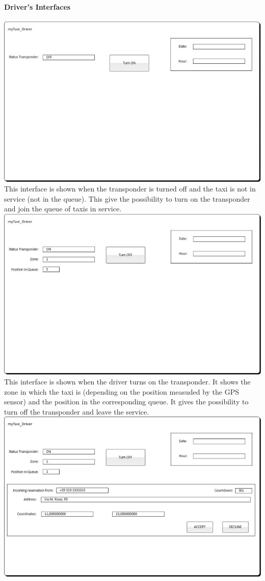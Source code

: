 \documentclass[12pt,a4paper]{book}
\begin{document}
				\paragraph{Driver's Interfaces}
				\hfill\break
				\includegraphics {driver_page1}
				\hfill\break
				This interface is shown when the transponder is turned off and the taxi is not in service (not in the queue). This give the possibility to turn on the transponder and join the queue of taxis in service.
				\hfill\break
				\hfill\break
				\includegraphics {driver_page2}
				\hfill\break
				This interface is shown when the driver turns on the transponder. It shows the zone in which the taxi is (depending on the position measuded by the GPS sensor) and the position in the corresponding queue. It gives the possibility to turn off the transponder and leave the service.
				\hfill\break
				\hfill\break
				\includegraphics {driver_page3}
\end{document}

